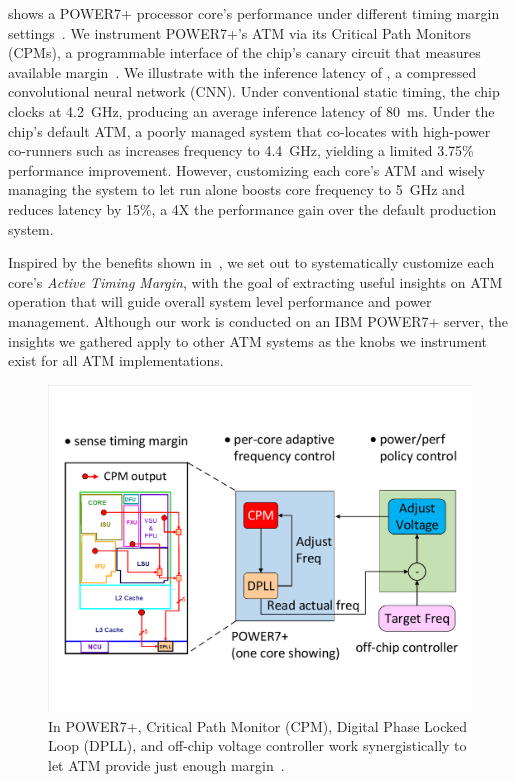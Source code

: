  shows a POWER7+ processor core's performance under different timing margin settings~\cite{sinharoy2011power7, floyd2011introducing}. We instrument POWER7+'s ATM via its Critical Path Monitors (CPMs), a programmable interface of the chip's canary circuit that measures available margin~\cite{lefurgy2011active, drake2013single}. We illustrate with the inference latency of , a compressed convolutional neural network (CNN). Under conventional static timing, the chip clocks at 4.2~GHz, producing an average inference latency of 80~ms. Under the chip's default ATM, a poorly managed system that co-locates  with high-power co-runners such as  increases frequency to 4.4~GHz, yielding a limited 3.75\% performance improvement. However, customizing each core's ATM and wisely managing the system to let  run alone boosts core frequency to 5~GHz and reduces latency by 15\%, a 4X the performance gain over the default production system.

Inspired by the benefits shown in~, we set out to systematically customize each core's \emph{Active Timing Margin}, with the goal of extracting useful insights on ATM operation that will guide overall system level performance and power management. Although our work is conducted on an IBM POWER7+ server, the insights we gathered apply to other ATM systems as the knobs we instrument exist for all ATM implementations.


\begin{figure}[t!]
  \centering
  \includegraphics[trim=20 80 20 80,clip,width=\linewidth]{graphs/process//atm-loop.pdf}
  \caption{In POWER7+, Critical Path Monitor (CPM), Digital Phase Locked Loop (DPLL), and off-chip voltage controller work synergistically to let ATM provide just enough margin~\cite{lefurgy2013active}.}
  \label{fig:active-margin-loop}
\end{figure}

